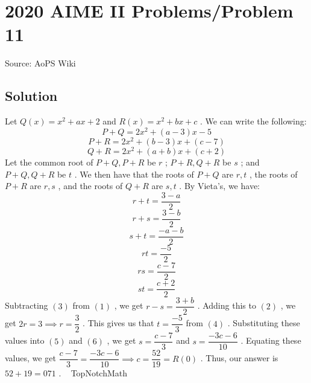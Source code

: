 \documentclass[12pt]{article}
\begin{document}
\section*{{2020 AIME II Problems/Problem 11}}
Source: AoPS Wiki

\subsection*{Solution}
Let $Q(x) = x^2 + ax + 2$ and $R(x) = x^2 + bx + c$ . We can write the following: \[P + Q = 2x^2 + (a - 3)x - 5\] \[P + R = 2x^2 + (b - 3)x + (c - 7)\] \[Q + R = 2x^2 + (a + b)x + (c + 2)\] Let the common root of $P+Q,P+R$ be $r$ ; $P+R,Q+R$ be $s$ ; and $P+Q,Q+R$ be $t$ . We then have that the roots of $P+Q$ are $r,t$ , the roots of $P + R$ are $r, s$ , and the roots of $Q + R$ are $s,t$ . By Vieta's, we have: \[r + t = \dfrac{3 - a}{2}\tag{1}\] \[r + s = \dfrac{3 - b}{2}\tag{2}\] \[s + t = \dfrac{-a - b}{2}\tag{3}\] \[rt = \dfrac{-5}{2}\tag{4}\] \[rs = \dfrac{c - 7}{2}\tag{5}\] \[st = \dfrac{c + 2}{2}\tag{6}\] Subtracting $(3)$ from $(1)$ , we get $r - s = \dfrac{3 + b}{2}$ . Adding this to $(2)$ , we get $2r = 3 \implies r = \dfrac{3}{2}$ . This gives us that $t = \dfrac{-5}{3}$ from $(4)$ . Substituting these values into $(5)$ and $(6)$ , we get $s = \dfrac{c-7}{3}$ and $s = \dfrac{-3c - 6}{10}$ . Equating these values, we get $\dfrac{c-7}{3} = \dfrac{-3c-6}{10} \implies c = \dfrac{52}{19} = R(0)$ . Thus, our answer is $52 + 19 = \boxed{071}$ . ~ TopNotchMath
\end{document}
